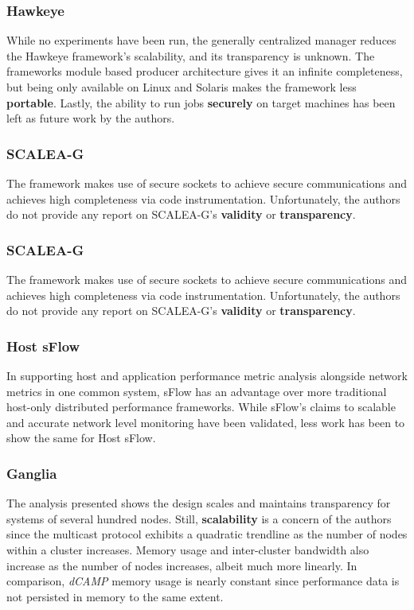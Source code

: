 \documentclass{beamer}
\newcommand{\dcamp}{\emph{dCAMP }}
\begin{document}
\begin{frame}
\frametitle{Hawkeye}
While no experiments have been run, the generally centralized manager reduces the Hawkeye framework's scalability, and
its transparency is unknown. The frameworks module based producer architecture gives it an infinite completeness, but
being only available on Linux and Solaris makes the framework less \textbf{portable}. Lastly, the ability to run jobs
\textbf{securely} on target machines has been left as future work by the authors.
\end{frame}

\begin{frame}
\frametitle{SCALEA-G}
The framework makes use of secure sockets to achieve secure communications and achieves high completeness via code
instrumentation. Unfortunately, the authors do not provide any report on SCALEA-G's \textbf{validity} or
\textbf{transparency}.
\end{frame}

\begin{frame}
\frametitle{SCALEA-G}
The framework makes use of secure sockets to achieve secure communications and achieves high completeness via code
instrumentation. Unfortunately, the authors do not provide any report on SCALEA-G's \textbf{validity} or
\textbf{transparency}.
\end{frame}

\begin{frame}
\frametitle{Host sFlow}
In supporting host and application performance metric analysis alongside network metrics in one common system, sFlow has
an advantage over more traditional host-only distributed performance frameworks. While sFlow's claims to scalable and
accurate network level monitoring have been validated, less work has been to show the same for Host sFlow.
\end{frame}

\begin{frame}
\frametitle{Ganglia}
The analysis presented shows the design scales and maintains transparency for systems of several hundred nodes. Still,
\textbf{scalability} is a concern of the authors since the multicast protocol exhibits a quadratic trendline as the
number of nodes within a cluster increases. Memory usage and inter-cluster bandwidth also increase as the number of
nodes increases, albeit much more linearly. In comparison, \dcamp memory usage is nearly constant since performance data
is not persisted in memory to the same extent.
\end{frame}
\end{document}
